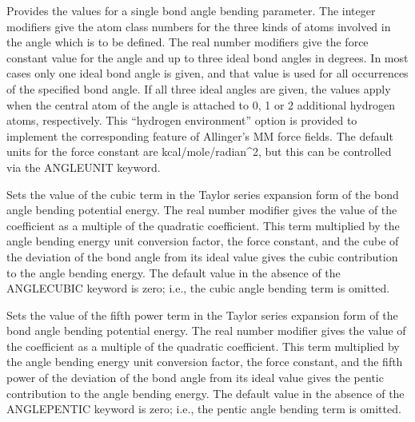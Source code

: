 \documentclass[letterpaper,11pt,english]{sphinxmanual}
\begin{document}
\ignorespaces {}\label{\detokenize{text/keywords:key-angle}}\begin{description}
\sphinxAtStartPar
Provides the values for a single bond angle bending parameter. The integer modifiers give the atom class numbers for the three kinds of atoms involved in the angle which is to be defined. The real number modifiers give the force constant value for the angle and up to three ideal bond angles in degrees. In most cases only one ideal bond angle is given, and that value is used for all occurrences of the specified bond angle. If all three ideal angles are given, the values apply when the central atom of the angle is attached to 0, 1 or 2 additional hydrogen atoms, respectively. This “hydrogen environment” option is provided to implement the corresponding feature of Allinger’s MM force fields. The default units for the force constant are kcal/mole/radian\textasciicircum{}2, but this can be controlled via the ANGLEUNIT keyword.

\end{description}

\ignorespaces {}\label{\detokenize{text/keywords:key-angle-cubic}}\begin{description}
\sphinxAtStartPar
Sets the value of the cubic term in the Taylor series expansion form of the bond angle bending potential energy. The real number modifier gives the value of the coefficient as a multiple of the quadratic coefficient. This term multiplied by the angle bending energy unit conversion factor, the force constant, and the cube of the deviation of the bond angle from its ideal value gives the cubic contribution to the angle bending energy. The default value in the absence of the ANGLE\sphinxhyphen{}CUBIC keyword is zero; i.e., the cubic angle bending term is omitted.

\end{description}

\ignorespaces {}\label{\detokenize{text/keywords:key-angle-pentic}}\begin{description}
\sphinxAtStartPar
Sets the value of the fifth power term in the Taylor series expansion form of the bond angle bending potential energy. The real number modifier gives the value of the coefficient as a multiple of the quadratic coefficient. This term multiplied by the angle bending energy unit conversion factor, the force constant, and the fifth power of the deviation of the bond angle from its ideal value gives the pentic contribution to the angle bending energy. The default value in the absence of the ANGLE\sphinxhyphen{}PENTIC keyword is zero; i.e., the pentic angle bending term is omitted.

\end{description}
\end{document}
